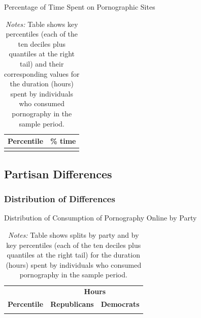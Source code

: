 \documentclass[12pt, letterpaper]{article}
\begin{document}
\begin{table}[ht] \centering \small \setlength\tabcolsep{10 pt}
	\caption{Percentage of Time Spent on Pornographic Sites}
	\label{tab:distribution_prop_duration}
	\begin{adjustbox}{max width=\textwidth}
		\begin{tabular}{cr}
			\toprule
			\multicolumn{1}{c}{\textbf{Percentile}}&\multicolumn{1}{c}{\textbf{\% time}}\\
			\midrule
			\\
			\bottomrule
		\end{tabular}
	\end{adjustbox}
	\caption*{\footnotesize \emph{Notes:} 
		Table shows key percentiles (each of the ten deciles plus quantiles at the right tail) and their corresponding values for the duration (hours) spent by individuals who consumed pornography in the sample period. 
	}
\end{table}

\FloatBarrier
\subsection{Partisan Differences}
\subsubsection{Distribution of Differences}
\begin{table}[ht] \centering \small \setlength\tabcolsep{10 pt}
	\caption{Distribution of Consumption of Pornography Online by Party}
	\label{tab:distribution_duration_party}
	\begin{adjustbox}{max width=\textwidth}
		\begin{tabular}{crr}
			\toprule
			\multicolumn{1}{l}{\textbf{}}&\multicolumn{2}{c}{\textbf{Hours}}\\
			\cmidrule(l){2-3}
			\multicolumn{1}{l}{\textbf{Percentile}}&\multicolumn{1}{c}{\textbf{Republicans}}&\multicolumn{1}{c}{\textbf{Democrats}}\\
			\midrule
			\\
			\bottomrule
		\end{tabular}
	\end{adjustbox}
	\caption*{\footnotesize \emph{Notes:} 
		Table shows splits by party and by key percentiles (each of the ten deciles plus quantiles at the right tail) for the duration (hours) spent by individuals who consumed pornography in the sample period. 
	}
\end{table}
\end{document}
